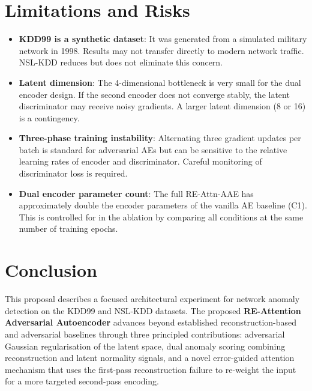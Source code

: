 \documentclass[12pt,a4paper]{article}
\begin{document}
\section{Limitations and Risks}

\begin{itemize}[leftmargin=2em]
    \item \textbf{KDD99 is a synthetic dataset}: It was generated from a
          simulated military network in 1998. Results may not transfer directly
          to modern network traffic. NSL-KDD reduces but does not eliminate
          this concern.

    \item \textbf{Latent dimension}: The 4-dimensional bottleneck is very
          small for the dual encoder design. If the second encoder does not
          converge stably, the latent discriminator may receive noisy gradients.
          A larger latent dimension (8 or 16) is a contingency.

    \item \textbf{Three-phase training instability}: Alternating three
          gradient updates per batch is standard for adversarial AEs but
          can be sensitive to the relative learning rates of encoder and
          discriminator. Careful monitoring of discriminator loss is required.

    \item \textbf{Dual encoder parameter count}: The full RE-Attn-AAE has
          approximately double the encoder parameters of the vanilla AE baseline
          (C1). This is controlled for in the ablation by comparing all conditions
          at the same number of training epochs.
\end{itemize}

\section{Conclusion}

This proposal describes a focused architectural experiment for network anomaly
detection on the KDD99 and NSL-KDD datasets. The proposed \textbf{RE-Attention
Adversarial Autoencoder} advances beyond established reconstruction-based
\citep{ae_analysis_nids} and adversarial \citep{alad,arcade} baselines through
three principled contributions: adversarial Gaussian regularisation of the latent
space, dual anomaly scoring combining reconstruction and latent normality signals,
and a novel error-guided attention mechanism that uses the first-pass reconstruction
failure to re-weight the input for a more targeted second-pass encoding.
\end{document}
